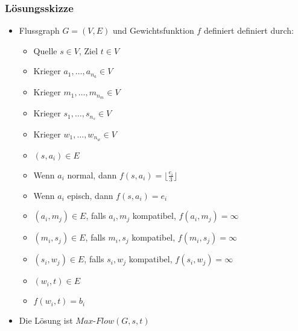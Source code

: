 \documentclass[10pt,dvipsnames]{beamer}
\begin{document}
  \begin{frame}
  \frametitle{Lösungsskizze}
  \begin{itemize}
    \item Flussgraph $G=(V,E)$ und Gewichtsfunktion $f$ definiert definiert durch:
      \begin{itemize}
        \item Quelle $s\in V$, Ziel $t \in V$
        \item Krieger $a_1,\dots,a_{n_a}\in V$
        \item Krieger $m_1,\dots,m_{n_m}\in V$
        \item Krieger $s_1,\dots,s_{n_s}\in V$
        \item Krieger $w_1,\dots,w_{n_w}\in V$
        \item $(s,a_i)\in E$
        \item Wenn $a_i$ normal, dann $f(s,a_i)=\lfloor\frac{e_i}{3}\rfloor$
        \item Wenn $a_i$ episch, dann $f(s,a_i)=e_i$
        \item $(a_i,m_j)\in E$, falls $a_i,m_j$ kompatibel, $f(a_i,m_j)=\infty$
        \item $(m_i,s_j)\in E$, falls $m_i,s_j$ kompatibel, $f(m_i,s_j)=\infty$
        \item $(s_i,w_j)\in E$, falls $s_i,w_j$ kompatibel, $f(s_i,w_j)=\infty$
        \item $(w_i,t)\in E$
        \item $f(w_i,t)=b_i$
      \end{itemize}
    \item Die Lösung ist $Max\mbox{-} Flow(G,s,t)$
  \end{itemize}
    
  \end{frame}
  
\end{document}
